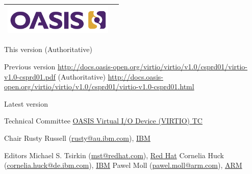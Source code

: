 \begin{titlepage}
\thispagestyle{fancy}

\begin{tabular*}{\textwidth}{@{\extracolsep{\fill}}lr}
	\includegraphics[height=0.55in]{images/oasis.png}\\
	\hline
\end{tabular*}

\oasistitle{\virtioversion}
\oasisstagelabel{\virtiodraftstagename\virtiodraftstageextratitle}
\vspace{0.05in}
\oasisstagelabel{\virtioworkingdraftdate}


\begin{oasistitlesection}{This version}
\virtiourltex{ }(Authoritative)\newline
\virtiourlpdf\newline
\virtiourlhtml
\end{oasistitlesection}

\begin{oasistitlesection}{Previous version}
\url{http://docs.oasis-open.org/virtio/virtio/v1.0/csprd01/virtio-v1.0-csprd01.pdf}
{ }(Authoritative)\newline
\url{http://docs.oasis-open.org/virtio/virtio/v1.0/csprd01/virtio-v1.0-csprd01.html}
\end{oasistitlesection}

\begin{oasistitlesection}{Latest version}
\virtiourllatestpdf\newline
\virtiourllatesthtml
\end{oasistitlesection}

\begin{oasistitlesection}{Technical Committee}
\href{https://www.oasis-open.org/committees/virtio/}{OASIS Virtual I/O Device (VIRTIO) TC}
\end{oasistitlesection}

\begin{oasistitlesection}{Chair}
Rusty Russell (\href{mailto:rusty@au.ibm.com}{rusty@au.ibm.com}), \href{http://www.ibm.com/}{IBM}\newline
\end{oasistitlesection}

\begin{oasistitlesection}{Editors}
Michael S. Tsirkin (\href{mailto:mst@redhat.com}{mst@redhat.com}), \href{http://www.redhat.com/}{Red Hat}\newline
Cornelia Huck (\href{mailto:cornelia.huck@de.ibm.com}{cornelia.huck@de.ibm.com}), \href{http://www.ibm.com/}{IBM}\newline
Pawel Moll (\href{mailto:pawel.moll@arm.com}{pawel.moll@arm.com}), \href{http://www.arm.com/}{ARM}
\end{oasistitlesection}



\end{titlepage}
